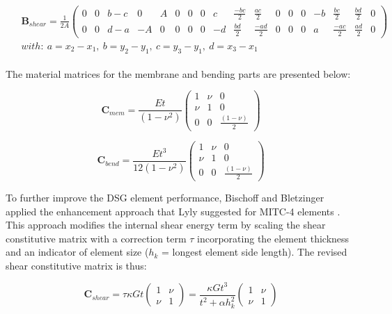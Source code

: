 \begin{gather} 
	\begin{aligned}
		& \mathbf{B}_{shear} =  \frac{1}{2 A}
		\begin{pmatrix}
			0 & 0 & b-c & 0 & A & 0 & 0 & 0 & c & \frac{-bc}{2} & \frac{ac}{2} & 0 & 0 & 0 & -b & \frac{bc}{2} & \frac{bd}{2} & 0 \\
			0 & 0 & d-a & -A & 0 & 0 & 0 & 0 & -d & \frac{bd}{2} & \frac{-ad}{2} & 0 & 0 & 0 & a & \frac{-ac}{2} & \frac{ad}{2} & 0
		\end{pmatrix}
		\\
		& with:\ 
		a = x_2-x_1,\ 
		b = y_2-y_1,\ 
		c = y_3-y_1,\ 
		d = x_3 - x_1
		\label{eqt10}
	\end{aligned}
\end{gather}

The material matrices for the membrane and bending parts are presented below:

\begin{equation} 
\mathbf{C}_{mem} =  \frac{Et}{(1-\nu^2)}
\begin{pmatrix}
1 & \nu & 0 \\
\nu & 1 & 0 \\
0 & 0 & \frac{(1-\nu)}{2}
\end{pmatrix}
\label{eqt11}
\end{equation}

\begin{equation} 
\mathbf{C}_{bend} =  \frac{E t^3}{12(1-\nu^2)}
\begin{pmatrix}
1 & \nu & 0 \\
\nu & 1 & 0 \\
0 & 0 & \frac{(1-\nu)}{2}
\end{pmatrix}
\label{eqt12}
\end{equation}

To further improve the DSG element performance, Bischoff and Bletzinger \cite{Bis04} \cite{Bis01} applied the enhancement approach that Lyly suggested for MITC-4 elements \cite{Lyl93}. This approach modifies the internal shear energy term by scaling the shear constitutive matrix with a correction term $\tau$ incorporating the element thickness and an indicator of element size ($h_k$ = longest element side length). The revised shear constitutive matrix is thus:

\begin{equation} 
\mathbf{C}_{shear} =  \tau \kappa Gt
\begin{pmatrix}
1 & \nu \\
\nu & 1 
\end{pmatrix}
=
\frac{\kappa G t^3}{t^2 + \alpha h_k^2}
\begin{pmatrix}
1 & \nu \\
\nu & 1 
\end{pmatrix}
\label{eqt14}
\end{equation}


